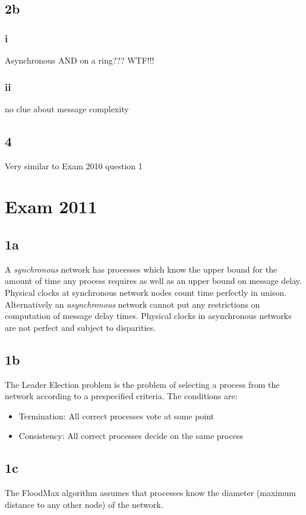 \documentclass[a4paper,10pt,]{report}
\begin{document}
\section{2b}
\subsection{i}
Asynchronous AND on a ring??? WTF!!!
\subsection{ii}
no clue about message complexity

\section{4}
Very similar to Exam 2010 question 1

\chapter{Exam 2011}

\section{1a}
A \emph{synchronous} network has processes which know the upper bound for the amount of time any process requires as well as an upper bound on message delay.  Physical clocks at synchronous network nodes count time perfectly in unison.  Alternatively an \emph{asynchronous} network cannot put any restrictions on computation of message delay times.  Physical clocks in asynchronous networks are not perfect and subject to disparities. 
\section{1b}
The Leader Election problem is the problem of selecting a process from the network according to a prespecified criteria.  The conditions are:
\begin{itemize}
\item Termination: All correct processes vote at some point
\item Consistency: All correct processes decide on the same process
\end{itemize}
\section{1c}
The FloodMax algorithm assumes that processes know the diameter (maximum distance to any other node) of the network.
\end{document}
